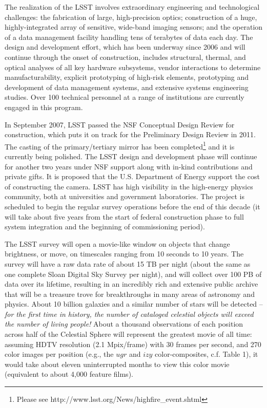 \documentclass{emulateapj}
\newcommand{\B}[1]{{#1}}
\begin{document}
The realization of the LSST involves extraordinary engineering and 
technological challenges: the fabrication of large, high-precision optics; 
construction of a huge, highly-integrated array of sensitive, wide-band 
imaging sensors; and the operation of a data management facility 
handling tens of terabytes of data each day. The design and development 
effort, which has been underway since 2006 and will continue through the 
onset of construction, includes structural, thermal, and optical analyses 
of all key hardware subsystems, vendor interactions to determine 
manufacturability, explicit prototyping of high-risk elements, prototyping 
and development of data management systems, and extensive systems engineering 
studies. Over 100 technical personnel at a range of institutions are currently 
engaged in this program. 

In September 2007, LSST passed the NSF Conceptual Design Review for construction, 
which puts it on track for the Preliminary Design Review in 2011.  
The casting of the primary/tertiary mirror has been completed\footnote{Please see
http://www.lsst.org/News/highfire\_event.shtml} and it is currently being polished. 
The LSST design and development phase will continue for another two years under 
NSF support along with in-kind contributions and private gifts.  It is 
proposed that the U.S. Department of Energy support the cost of constructing the 
camera. LSST has high visibility in the high-energy physics community,
both at universities and government laboratories. The project is scheduled to 
begin the regular survey operations before the end of this decade
(it will take about five years from the start of federal construction phase
to full system integration and the beginning of commissioning period). 

The LSST survey will open a movie-like window on objects that 
change brightness, or move, on timescales ranging from 10 seconds to 10 years.
The survey will have a raw data rate of about 15 TB per night (about the same as one
complete Sloan Digital Sky Survey per night), and will collect over 100 PB
of data over its lifetime, resulting in an incredibly rich and extensive
public archive that will be a treasure trove for breakthroughs in many areas 
of astronomy and physics. About 10 billion galaxies and a similar number of stars
will be detected -- {\it for the first time in history, the number of cataloged 
celestial objects will exceed the number of living people!} About a thousand
observations of each position across half of the Celestial Sphere will
represent the greatest movie of all time: assuming HDTV resolution (2.1
Mpix/frame) with 30 frames per second, and 270 color images per position
(e.g., the $ugr$ and $izy$ color-composites, c.f. Table 1), it would take 
about eleven uninterrupted months to view this color movie (equivalent
to about 4,000 feature films). 
\end{document}
